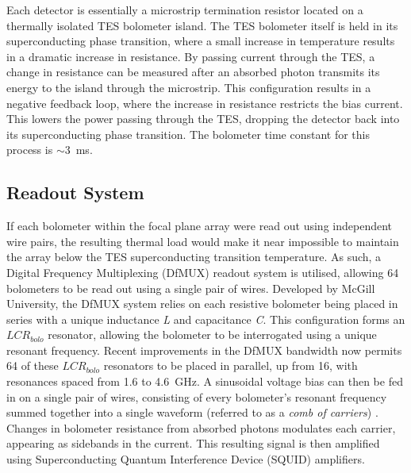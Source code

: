 \documentclass[iop]{emulateapj}
\begin{document}
Each detector is essentially a microstrip termination resistor located on a thermally isolated TES bolometer island.  The TES bolometer itself is held in its superconducting phase transition, where a small increase in temperature results in a dramatic increase in resistance.  By passing current through the TES, a change in resistance can be measured after an absorbed photon transmits its energy to the island through the microstrip.  This configuration results in a negative feedback loop, where the increase in resistance restricts the bias current.  This lowers the power passing through the TES, dropping the detector back into its superconducting phase transition.  The bolometer time constant for this process is $\sim$3~ms.


\subsection{Readout System}

If each bolometer within the focal plane array were read out using independent wire pairs, the resulting thermal load would make it near impossible to maintain the array below the TES superconducting transition temperature.  As such, a Digital Frequency Multiplexing (DfMUX) readout system is utilised, allowing 64 bolometers to be read out using a single pair of wires.  Developed by McGill University, the DfMUX system relies on each resistive bolometer being placed in series with a unique inductance \textit{L} and capacitance \textit{C}.  This configuration forms an $LCR_{bolo}$ resonator, allowing the bolometer to be interrogated using a unique resonant frequency.  Recent improvements in the DfMUX bandwidth now permits 64 of these $LCR_{bolo}$ resonators to be placed in parallel, up from 16, with resonances spaced from 1.6 to 4.6~GHz.  A sinusoidal voltage bias can then be fed in on a single pair of wires, consisting of every bolometer's resonant frequency summed together into a single waveform (referred to as a \textit{comb of carriers}) \citep{bender_digital_2014}.  Changes in bolometer resistance from absorbed photons modulates each carrier, appearing as sidebands in the current.  This resulting signal is then amplified using Superconducting Quantum Interference Device (SQUID) amplifiers.
\end{document}
